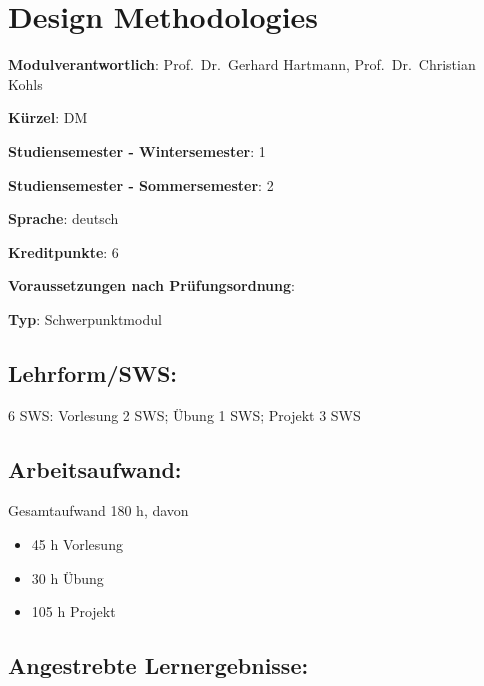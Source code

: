 \chapter{Design Methodologies}\label{design-methodologies}

\begin{modulHead}
\textbf{Modulverantwortlich}: Prof.~Dr.~Gerhard
Hartmann, Prof.~Dr.~Christian
Kohls
\end{modulHead}
\begin{modulHead}
\textbf{Kürzel}:
DM
\end{modulHead}
\begin{modulHead}
\textbf{Studiensemester -
Wintersemester}:
1
\end{modulHead}
\begin{modulHead}
\textbf{Studiensemester -
Sommersemester}: 2
\end{modulHead}
\begin{modulHead}
\textbf{Sprache}:
deutsch
\end{modulHead}
\begin{modulHead}
\textbf{Kreditpunkte}:
6
\end{modulHead}
\begin{modulHead}
\textbf{Voraussetzungen nach
Prüfungsordnung}: 
\end{modulHead}
\begin{modulHead}
\textbf{Typ}:
Schwerpunktmodul
\end{modulHead}


\section*{Lehrform/SWS:}\label{lehrformsws-5}

6 SWS: Vorlesung 2 SWS; Übung 1 SWS; Projekt 3 SWS

\section*{Arbeitsaufwand:}\label{arbeitsaufwand-10}

Gesamtaufwand 180 h, davon

\begin{itemize}
\tightlist
\item
  45 h Vorlesung
\item
  30 h Übung
\item
  105 h Projekt
\end{itemize}

\section*{Angestrebte
Lernergebnisse:}\label{angestrebte-lernergebnisse-4}

